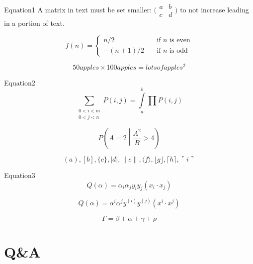 \begin{frame}{Equation1}
    A matrix in text must be set  smaller:
    $\bigl(\begin{smallmatrix}
    a&b \\ c&d
    \end{smallmatrix} \bigr)$
    to not increase leading in a portion of text.

    \[ f(n) =
    \begin{cases}
        n/2       & \quad \text{if } n \text{ is even}\\
        -(n+1)/2  & \quad \text{if } n \text{ is odd}
    \end{cases}
    \]

    $$50 apples \times 100 apples = lots of apples^2$$
\end{frame}

\begin{frame}{Equation2}
    $$\sum_{\substack{0<i<m \\ 0<j<n }} 
      P(i,j)=\int\limits_a^b\prod P(i,j)$$

    $$P\left(A=2\middle|\frac{A^2}{B}>4\right)$$

    $$( a ), [ b ], \{ c \}, | d |, \| e \|,
    \langle f \rangle, \lfloor g \rfloor,
    \lceil h \rceil, \ulcorner i \urcorner$$
\end{frame}

\begin{frame}{Equation3}
    $$Q(\alpha)=\alpha_i\alpha_jy_iy_j(x_i\cdot x_j)$$

    $$Q(\alpha)=\alpha^i\alpha^jy^{(i)}y^{(j)}(x^i\cdot x^j)$$
    
    $$\Gamma=\beta+\alpha+\gamma+\rho$$
\end{frame}



\section*{Q\&A}
\begin{frame}
    \centering
    \vspace{2.2cm}


    \vspace{0.4cm}{\Large\itshape \faSlideshare~Looking Forward to Your Comments!}
\end{frame}